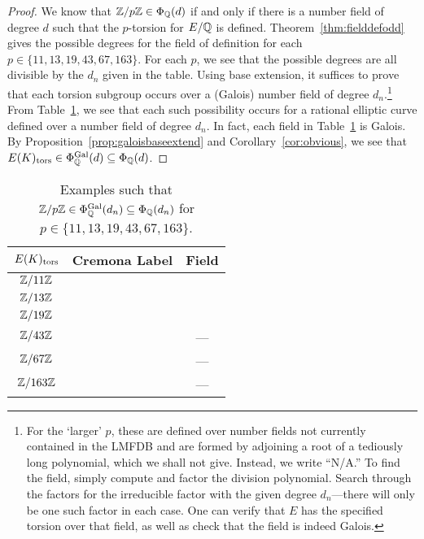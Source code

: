 \begin{proof}
We know that $\mathbb{Z}/p\mathbb{Z} \in \Phi_{\mathbb{Q}}(d)$ if and only if there is a number field of degree $d$ such that the $p$-torsion for $E/\mathbb{Q}$ is defined. Theorem~\ref{thm:fielddefodd} gives the possible degrees for the field of definition for each $p \in \{ 11, 13, 19, 43, 67, 163 \}$. For each $p$, we see that the possible degrees are all divisible by the $d_n$ given in the table. Using base extension, it suffices to prove that each torsion subgroup occurs over a (Galois) number field of degree $d_n$.\footnote{For the `larger' $p$, these are defined over number fields not currently contained in the LMFDB and are formed by adjoining a root of a tediously long polynomial, which we shall not give. Instead, we write ``N/A.'' To find the field, simply compute and factor the division polynomial. Search through the factors for the irreducible factor with the given degree $d_n$---there will only be one such factor in each case. One can verify that $E$ has the specified torsion over that field, as well as check that the field is indeed Galois.} From Table~\ref{tab:finpexamples}, we see that each such possibility occurs for a rational elliptic curve defined over a number field of degree $d_n$. In fact, each field in Table~\ref{tab:finpexamples} is Galois. By Proposition~\ref{prop:galoisbaseextend} and Corollary~\ref{cor:obvious}, we see that $E(K)_{\text{tors}} \in \Phi_{\mathbb{Q}}^{\operatorname{Gal}}(d) \subseteq \Phi_{\mathbb{Q}}(d)$. 
\end{proof}


	\begin{table}[!ht]
	\centering
	\caption{Examples such that $\mathbb{Z}/p\mathbb{Z} \in \Phi_{\mathbb{Q}}^{\operatorname{Gal}}(d_n) \subseteq \Phi_{\mathbb{Q}}(d_n)$ for $p \in \{ 11, 13, 19, 43, 67, 163 \}$.\label{tab:finpexamples}}
	\begin{tabular}{ccc} \hline
	$E(K)_{\text{tors}}$ & Cremona Label & Field \\ \hline
	$\mathbb{Z}/11\mathbb{Z}$ & \otoco{} & \qzetaeep{} \\
	$\mathbb{Z}/13\mathbb{Z}$ & \ofsbo{} & \qzetasp{} \\
	$\mathbb{Z}/19\mathbb{Z}$ & \tsoao{} & \qzetantp{} \\
	$\mathbb{Z}/43\mathbb{Z}$ & \oefnao{} & --- \\
	$\mathbb{Z}/67\mathbb{Z}$ & \ffenao{} & --- \\
	$\mathbb{Z}/163\mathbb{Z}$ & \tsfsnao{} & ---
	\end{tabular}
	\end{table}


